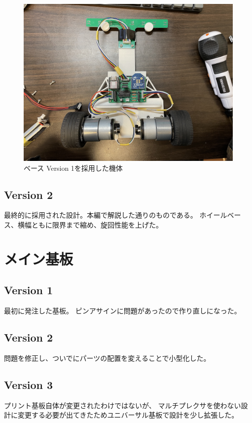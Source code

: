 \documentclass{ltjsreport}
\begin{document}
\begin{figure}[bth]
  \centering
  \includegraphics[keepaspectratio, scale=0.11]
       {img/ver1_machine.jpg}
  \caption{ベース Version 1を採用した機体}
  \label{fig:v1_machine}
 \end{figure}

\subsection{Version 2}
最終的に採用された設計。本編で解説した通りのものである。
ホイールベース、横幅ともに限界まで縮め、旋回性能を上げた。



\section{メイン基板}
\subsection{Version 1}
最初に発注した基板。
ピンアサインに問題があったので作り直しになった。

\subsection{Version 2}
問題を修正し、ついでにパーツの配置を変えることで小型化した。


\subsection{Version 3}
プリント基板自体が変更されたわけではないが、
マルチプレクサを使わない設計に変更する必要が出てきたためユニバーサル基板で設計を少し拡張した。
\end{document}
